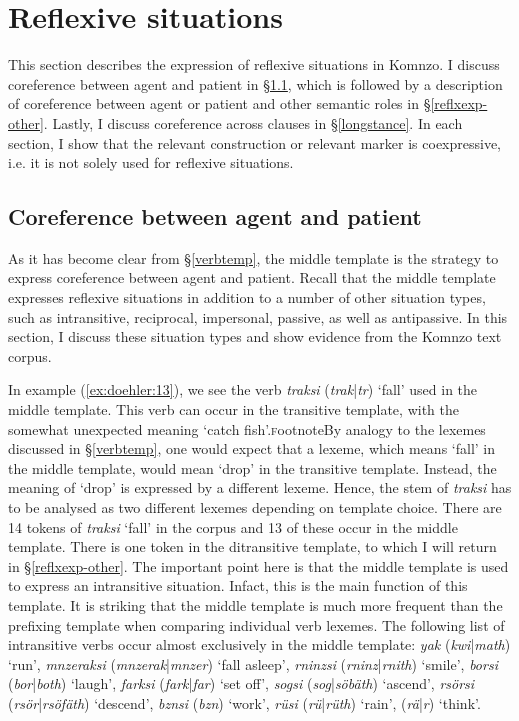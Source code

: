 \documentclass[output=paper]{langscibook}
\begin{document}
\section{Reflexive situations}\label{reflxexp}
This section describes the expression of reflexive situations in Komnzo. I discuss coreference between agent and patient in \S\ref{reflxexp-mid}, which is followed by a description of coreference between agent or patient and other semantic roles in \S\ref{reflxexp-other}. Lastly, I discuss coreference across clauses in \S\ref{longstance}. In each section, I show that the relevant construction or relevant marker is coexpressive, i.e. it is not solely used for reflexive situations.
\subsection{Coreference between agent and patient}\label{reflxexp-mid}
As it has become clear from \S\ref{verbtemp}, the middle template is the strategy to express coreference between agent and patient. Recall that the middle template expresses reflexive situations in addition to a number of other situation types, such as intransitive, reciprocal, impersonal, passive, as well as antipassive. In this section, I discuss these situation types and show evidence from the Komnzo text corpus.

In example (\ref{ex:doehler:13}), we see the verb \emph{traksi} (\emph{trak}|\emph{tr}) `fall' used in the middle template. This verb can occur in the transitive template, with the somewhat unexpected meaning `catch fish'.\textsc{f}ootnote{By analogy to the lexemes discussed in \S\ref{verbtemp}, one would expect that a lexeme, which means `fall' in the middle template, would mean `drop' in the transitive template. Instead, the meaning of `drop' is expressed by a different lexeme.} Hence, the stem of \emph{traksi} has to be analysed as two different lexemes depending on template choice. There are 14 tokens of \emph{traksi} `fall' in the corpus and 13 of these occur in the middle template. There is one token in the ditransitive template, to which I will return in \S\ref{reflxexp-other}. The important point here is that the middle template is used to express an intransitive situation. Infact, this is the main function of this template. It is striking that the middle template is much more frequent than the prefixing template when comparing individual verb lexemes. The following list of intransitive verbs occur almost exclusively in the middle template: \emph{yak} (\emph{kwi}|\emph{math}) `run', \emph{mnzeraksi} (\emph{mnzerak}|\emph{mnzer}) `fall asleep', \emph{rninzsi} (\emph{rninz}|\emph{rnith}) `smile', \emph{borsi} (\emph{bor}|\emph{both}) `laugh', \emph{farksi} (\emph{fark}|\emph{far}) `set off', \emph{sogsi} (\emph{sog}|\emph{söbäth}) `ascend', \emph{rsörsi} (\emph{rsör}|\emph{rsöfäth}) `descend', \emph{bznsi} (\emph{bzn}) `work', \emph{rüsi} (\emph{rü}|\emph{rüth}) `rain', (\emph{rä}|\emph{r}) `think'.
\end{document}
